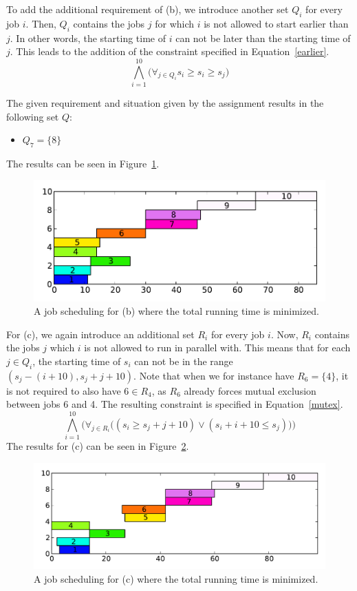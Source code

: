 To add the additional requirement of (b), we introduce another set $Q_i$ for every job $i$. Then, $Q_i$ contains the jobs $j$ for which $i$ is not allowed to start earlier than $j$. In other words, the starting time of $i$ can not be later than the starting time of $j$. This leads to the addition of the constraint specified in Equation~\ref{earlier}.
\begin{equation}
    \label{earlier}
    \bigwedge^{10}_{i=1}\big(\forall_{j\in Q_i} s_i \geq s_i \geq s_j \big)
\end{equation}

The given requirement and situation given by the assignment results in the following set $Q$:
\begin{itemize}
    \item $Q_7 = \{8\}$
\end{itemize}
The results can be seen in Figure~\ref{fig:3b}.
\begin{figure}[H]
    \centering
    \includegraphics[width=\columnwidth]{3/b.out.pdf}
    \caption{A job scheduling for (b) where the total running time is minimized.}
    \label{fig:3b}
\end{figure}

For (c), we again introduce an additional set $R_i$ for every job $i$. Now, $R_i$ contains the jobs $j$ which $i$ is not allowed to run in parallel with. This means that for each $j \in Q_i$, the starting time of $s_i$ can not be in the range $(s_j - (i + 10), s_j + j + 10)$. Note that when we for instance have $R_6 = \{4\}$, it is not required to also have $6 \in R_4$, as $R_6$ already forces mutual exclusion between jobs 6 and 4. The resulting constraint is specified in Equation~\ref{mutex}.
\begin{equation}
    \label{mutex}
    \bigwedge^{10}_{i=1}\bigg(\forall_{j \in R_i}\big((s_i \geq s_j + j + 10) \vee (s_i + i + 10 \leq s_j)\big)\bigg)
\end{equation}
The results for (c) can be seen in Figure~\ref{fig:3c}.
\begin{figure}[H]
    \centering
    \includegraphics[width=\columnwidth]{3/c.out.pdf}
    \caption{A job scheduling for (c) where the total running time is minimized.}
    \label{fig:3c}
\end{figure}
